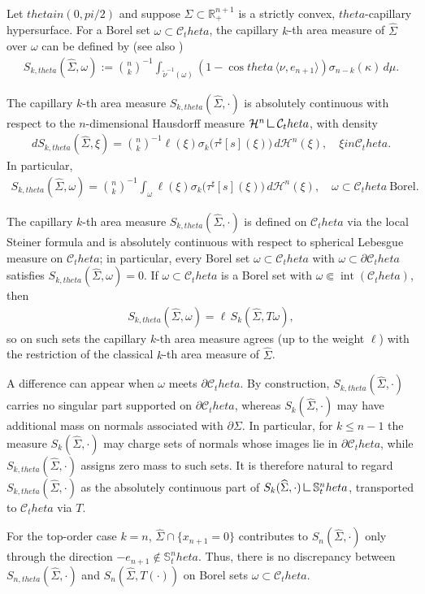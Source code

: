 \documentclass[12pt]{amsart}
\def\theta{theta}%
\def\pi{pi}%
\def\in{in }%
\newcommand{\mres}{\mathbin{\vrule height 1.6ex depth 0pt width 0.13ex\vrule height 0.13ex depth 0pt width 1.3ex}}
\numberwithin{equation}{section}
\newcommand{\wh}{\widehat}
\newcommand{\bbS}{\mathbb{S}}
\newcommand{\Sn}{\mathbb{S}^n}
\newcommand{\op}[1]{\operatorname{#1}}
\newcommand{\8}{\infty}
\newcommand{\Si}{\Sigma}
\newcommand{\cC}{\mathcal{C}}
\newcommand{\cH}{\mathcal{H}}
\newcommand{\eq}[1]{\begin{equation}\begin{alignedat}{2}#1\end{alignedat}\end{equation}}
\newcommand{\Cth}{\cC_\theta}
\newcommand{\R}{\mathbb{R}}
\begin{document}
\begin{defn}\label{capillary-k-area-measure}
Let $\theta\in(0,\pi/2)$ and suppose $\Si\subset\R^{n+1}_+$ is a strictly convex, $\theta$-capillary hypersurface. 
For a Borel set $\omega\subset\Cth$, the capillary $k$-th area measure
of $\wh\Si$ over $\omega$ can be defined by (see also \cite{MWW25c})
\eq{\label{eq:cap-k-SA-local}
  S_{k,\theta}(\wh\Si,\omega)
  := \binom{n}{k}^{-1}
     \int_{\tilde{\nu}^{-1}(\omega)}
       (1-\cos\theta\,\langle\nu,e_{n+1}\rangle)
       \sigma_{n-k}(\kappa)\,d\mu.
}

The capillary $k$-th area measure $ S_{k,\theta}(\wh\Si,\cdot)$ is absolutely continuous with respect to
the $n$-dimensional Hausdorff measure $\cH^n\mres\Cth$, with density
\eq{\label{eq:cap-k-SA-density}
  dS_{k,\theta}(\wh\Si,\xi)
  =\binom{n}{k}^{-1}\ell(\xi)\sigma_k\bigl(\tau^\sharp[s](\xi)\bigr)\,d\cH^n(\xi),
  \quad \xi\in\Cth.
}
In particular,
\eq{
  S_{k,\theta}(\wh\Si,\omega)
  = \binom{n}{k}^{-1}\int_\omega \ell(\xi)\sigma_k\bigl(\tau^\sharp[s](\xi)\bigr)\,d\cH^n(\xi),
  \quad \omega\subset\Cth\ \text{Borel}.
}
\end{defn}

\begin{rem}\label{area measure-standard-vs-capillary}
The capillary $k$-th area measure $S_{k,\theta}(\wh{\Sigma},\cdot)$ is defined on $\Cth$ via the local Steiner formula and is absolutely continuous with
respect to spherical Lebesgue measure on $\Cth$; in particular, every Borel set $\omega\subset\Cth$ with $\omega\subset\partial\Cth$ satisfies
$S_{k,\theta}(\wh{\Sigma},\omega)=0$. If $\omega\subset\Cth$ is a Borel set with $\omega\Subset\op{int}(\Cth)$, then
\eq{
  S_{k,\theta}(\wh{\Sigma},\omega)
  = \ell\,S_k(\wh{\Sigma},T\omega),
}
so on such sets the capillary $k$-th area measure agrees (up to the weight $\ell$) with the restriction of the classical $k$-th area measure of $\wh{\Sigma}$.

A difference can appear when $\omega$ meets $\partial\Cth$. By construction, $S_{k,\theta}(\wh{\Sigma},\cdot)$ carries no singular part supported on $\partial\Cth$, whereas $S_k(\wh{\Sigma},\cdot)$ may have additional mass on normals associated with $\partial\Sigma$. In particular,
for $k\leq n-1$ the measure $S_{k}(\wh{\Sigma},\cdot)$ may charge sets of normals whose images lie in $\partial\Cth$, while $S_{k,\theta}(\wh{\Sigma},\cdot)$ assigns zero mass to such sets. It is therefore natural to regard $S_{k,\theta}(\wh{\Sigma},\cdot)$ as the absolutely continuous part of $S_k(\wh{\Sigma},\cdot)\mres\Sn_\theta$, transported to $\Cth$ via $T$.

For the top-order case $k=n$,  $\wh{\Sigma}\cap\{x_{n+1}=0\}$ contributes to $S_n(\wh{\Sigma},\cdot)$ only through the direction $-e_{n+1}\notin\bbS^n_\theta$. Thus, there is no discrepancy between 
$S_{n,\theta}(\wh{\Sigma},\cdot)$ and $S_n(\wh{\Sigma},T(\cdot))$ on Borel sets 
$\omega\subset\Cth$.
\end{rem}
\end{document}
